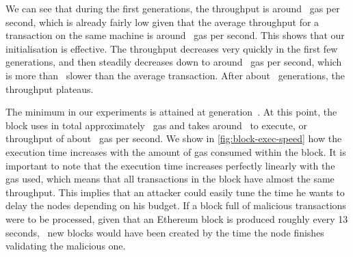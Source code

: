   We can see that during the first generations, the throughput is around~ gas per second, which is already fairly low given that the average throughput for a transaction on the same machine is around~ gas per second. This shows that our initialisation is effective. The throughput decreases very quickly in the first few generations, and then steadily decreases down to around~ gas per second, which is more than~ slower than the average transaction. After about~ generations, the throughput plateaus.

  The minimum in our experiments is attained at generation~. At this point, the block uses in total approximately~ gas and takes around~ to execute, or throughput of about~ gas per second. We show in \autoref{fig:block-exec-speed} how the execution time increases with the amount of gas consumed within the block.
  It is important to note that the execution time increases perfectly linearly with the gas used, which means that all transactions in the block have almost the same throughput. This implies that an attacker could easily tune the time he wants to delay the nodes depending on his budget. If a block full of malicious transactions were to be processed, given that an Ethereum block is produced roughly every 13 seconds,~ new blocks would have been created by the time the node finishes validating the malicious one.

